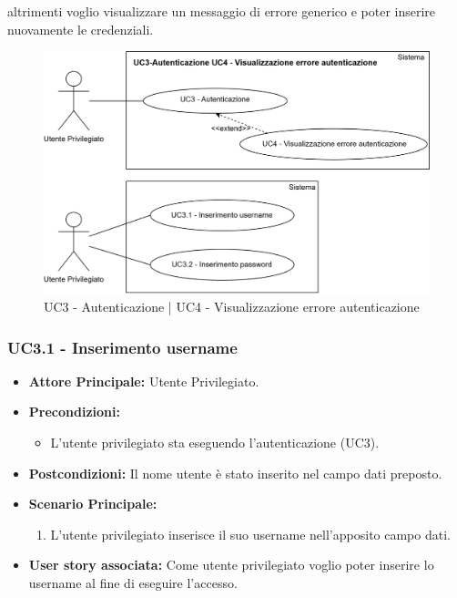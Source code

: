 \documentclass[11pt]{article}
\begin{document}
\begin{justify}
\begin{itemize}
     altrimenti voglio visualizzare un messaggio di errore generico e poter inserire nuovamente le credenziali.
\end{itemize}
\begin{figure}[ht]
    \centering
    \includegraphics[width=0.5\linewidth]{UC3-UC4image.png}
    \caption{UC3 - Autenticazione | UC4 - Visualizzazione errore autenticazione}
    \label{fig:UC3 e UC4}
\end{figure}
\subsubsection{\textbf{UC3.1 - Inserimento username}}
\begin{itemize}
     \item \textbf{Attore Principale:} Utente Privilegiato.
     \item \textbf{Precondizioni:} 
            \begin{itemize}
                \item L'utente privilegiato sta eseguendo l'autenticazione (UC3).
            \end{itemize}
     \item \textbf{Postcondizioni:} Il nome utente è stato inserito nel campo dati preposto.
     \item \textbf{Scenario Principale:}
        \begin{enumerate}
            \item L'utente privilegiato inserisce il suo username nell'apposito campo dati.
        \end{enumerate}
     \item \textbf{User story associata:} Come utente privilegiato voglio poter inserire lo username al fine di eseguire l'accesso.
\end{itemize}

\end{justify}
\end{document}

